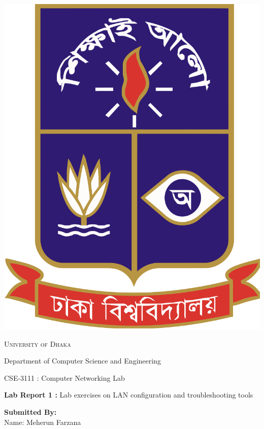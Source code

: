 \documentclass[11pt]{article}
\begin{document}
\begin{titlepage}
	\begin{center}
    	\includegraphics[scale=0.10]{res/du.png}\par
		\begin{Huge}
			\textsc{University of Dhaka}\par
		\end{Huge}
		\begin{Large}
			Department of Computer Science and Engineering\par \vspace{0.5cm}
			CSE-3111 : Computer Networking Lab \\[12pt]	
		\end{Large}
			\textbf{Lab Report 1 :}
			Lab exercises on LAN configuration and troubleshooting tools \\[8pt]
			\begin{large}
				\textbf{Submitted By:\\[12pt]}
				Name: Meherun Farzana\\[8pt]

\end{large}
\end{center}
\end{titlepage}
\end{document}
